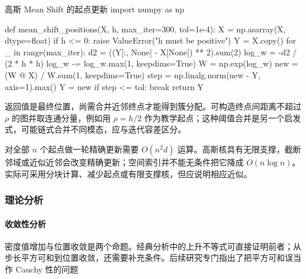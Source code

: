\begin{codeblock}[language=Python,label={code:clustering-mean-shift}]{高斯 Mean Shift 的起点更新}
import numpy as np

def mean_shift_positions(X, h, max_iter=300, tol=1e-4):
    X = np.asarray(X, dtype=float)
    if h <= 0:
        raise ValueError("h must be positive")
    Y = X.copy()
    for _ in range(max_iter):
        d2 = ((Y[:, None] - X[None]) ** 2).sum(2)
        log_w = -d2 / (2 * h * h)
        log_w -= log_w.max(1, keepdims=True)
        W = np.exp(log_w)
        new = (W @ X) / W.sum(1, keepdims=True)
        step = np.linalg.norm(new - Y, axis=1).max()
        Y = new
        if step <= tol:
            break
    return Y
\end{codeblock}

返回值是最终位置，尚需合并近邻终点才能得到簇分配。可构造终点间距离不超过 $\rho$ 的图并取连通分量，例如用 $\rho=h/2$ 作为教学起点；这种阈值合并是另一个启发式，可能链式合并不同模态，应与迭代容差区分。

对全部 $n$ 个起点做一轮精确更新需要 $O(n^2d)$ 运算。高斯核具有无限支撑，截断邻域或近似近邻会改变精确更新；空间索引并不能无条件把它降成 $O(n\log n)$。实际可采用分块计算、减少起点或有限支撑核，但应说明相应近似。

\subsubsection{理论分析}

\paragraph{收敛性分析}
密度值增加与位置收敛是两个命题。经典分析中的上升不等式可直接证明前者；从步长平方可和到位置收敛，还需要补充条件。后续研究专门指出了把平方可和误当作 Cauchy 性的问题

